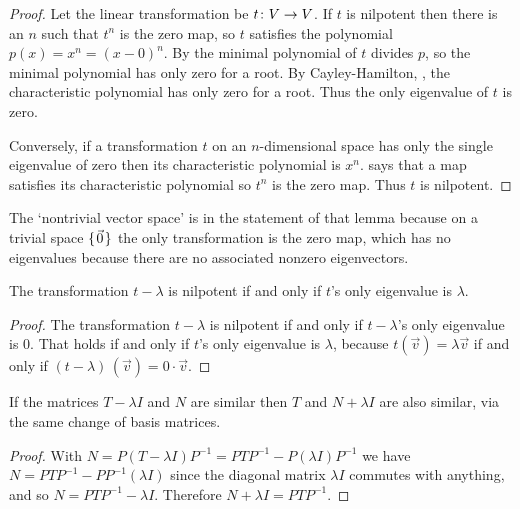 \begin{proof}
Let the linear transformation be $\mbox{$t\colon V\to V$}$.
If $t$ is nilpotent then there is an $n$ such that $t^n$ is the zero map,
so $t$ satisfies the polynomial $p(x)=x^n=(x-0)^n$.
By  the minimal polynomial of 
$t$ divides $p$, so the minimal polynomial has only zero for a root.
By Cayley-Hamilton, ,
the characteristic polynomial has only zero for a root.
Thus the only eigenvalue of $t$ is zero.

Conversely, if a transformation \( t \) on an
\( n \)-dimensional space has only the single eigenvalue of zero 
then its characteristic polynomial is \( x^n \). 
 says that a map satisfies its
characteristic polynomial so \( t^n \) is the zero map.
Thus $t$ is nilpotent.
\end{proof}

\noindent The `nontrivial vector space' is in the statement of 
that lemma because on a trivial
space $\mbox{$\{\hspace{0.1em}\vec{0}\hspace{0.1em}\}$}$ the only transformation is the zero map, which has
no eigenvalues because there are no associated nonzero eigenvectors.

\begin{corollary} \label{cor:tMinLambdaNilpotent}
The transformation $t-\lambda$ is nilpotent if and only if 
$t$'s only eigenvalue is $\lambda$.   
\end{corollary}

\begin{proof}
The transformation \( t-\lambda \) is nilpotent if and only if
$t-\lambda$'s only eigenvalue is \( 0 \).
That holds if and only if $t$'s only eigenvalue is $\lambda$, because
\( t(\vec{v})=\lambda\vec{v} \) if and 
only if \( (t-\lambda)\,(\vec{v})=0\cdot\vec{v} \).
\end{proof}

\begin{lemma}   \label{le:SimRespAddScalar}
If the matrices \( T-\lambda I \) and \( N \) are similar 
then \( T \) and \( N+\lambda I \) are also similar,
via the same change of basis matrices.
\end{lemma}

\begin{proof}
With \( N=P(T-\lambda I)P^{-1}=PTP^{-1}-P(\lambda I)P^{-1} \)
we have $N=PTP^{-1}-PP^{-1}(\lambda I)$
since the diagonal matrix \( \lambda I \) commutes with anything, 
and so \( N=PTP^{-1}-\lambda I \).
Therefore \( N+\lambda I=PTP^{-1} \).
\end{proof}

